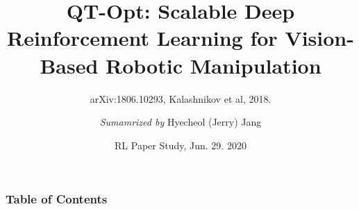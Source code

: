 \documentclass{beamer}
\title{QT-Opt: Scalable Deep Reinforcement Learning for Vision-Based Robotic Manipulation}
\subtitle{arXiv:1806.10293, Kalashnikov et al, 2018.}
\author{\textit{Sumamrized by} Hyecheol (Jerry) Jang}
\institute{
  Department of Computer Sciences\\
  University of Wisconsin–Madison
}
\date{RL Paper Study, Jun. 29. 2020}
\begin{document}
  \frame{\titlepage}
  
  \begin{frame}
    \frametitle{Table of Contents}
    \tableofcontents
  \end{frame}
\end{document}
